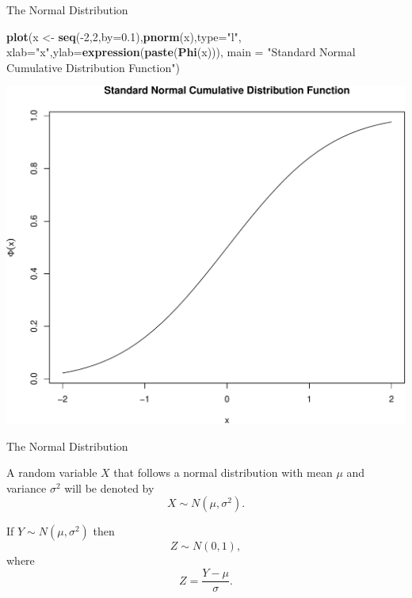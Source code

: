 \documentclass[9pt,ignorenonframetext,]{beamer}
\newenvironment{Shaded}{\begin{snugshade}}{\end{snugshade}}
\newcommand{\KeywordTok}[1]{\textcolor[rgb]{0.13,0.29,0.53}{\textbf{{#1}}}}
\newcommand{\DataTypeTok}[1]{\textcolor[rgb]{0.13,0.29,0.53}{{#1}}}
\newcommand{\DecValTok}[1]{\textcolor[rgb]{0.00,0.00,0.81}{{#1}}}
\newcommand{\FloatTok}[1]{\textcolor[rgb]{0.00,0.00,0.81}{{#1}}}
\newcommand{\StringTok}[1]{\textcolor[rgb]{0.31,0.60,0.02}{{#1}}}
\newcommand{\NormalTok}[1]{{#1}}
\begin{document}
\begin{frame}[fragile]{The Normal Distribution}

\begin{Shaded}
\begin{Highlighting}[]
\KeywordTok{plot}\NormalTok{(x <-}\StringTok{ }\KeywordTok{seq}\NormalTok{(-}\DecValTok{2}\NormalTok{,}\DecValTok{2}\NormalTok{,}\DataTypeTok{by=}\FloatTok{0.1}\NormalTok{),}\KeywordTok{pnorm}\NormalTok{(x),}\DataTypeTok{type=}\StringTok{"l"}\NormalTok{,}
     \DataTypeTok{xlab=}\StringTok{"x"}\NormalTok{,}\DataTypeTok{ylab=}\KeywordTok{expression}\NormalTok{(}\KeywordTok{paste}\NormalTok{(}\KeywordTok{Phi}\NormalTok{(x))),}
     \DataTypeTok{main =} \StringTok{"Standard Normal Cumulative Distribution Function"}\NormalTok{)}
\end{Highlighting}
\end{Shaded}

\includegraphics{class2-jan11_files/figure-beamer/unnamed-chunk-6-1.pdf}

\end{frame}

\begin{frame}{The Normal Distribution}

A random variable \(X\) that follows a normal distribution with mean
\(\mu\) and variance \(\sigma^2\) will be denoted by
\[X \sim N\left(\mu, \sigma^2\right).\]

If \(Y \sim N\left(\mu, \sigma^2\right)\) then \[Z \sim N(0,1),\] where
\[Z=\frac{Y-\mu}{\sigma}.\]

\end{frame}
\end{document}
